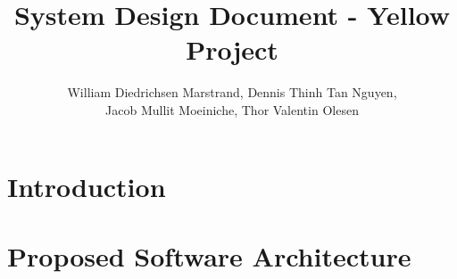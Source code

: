 \documentclass{article}
\title{System Design Document - Yellow Project}
\author{William Diedrichsen Marstrand, Dennis Thinh Tan Nguyen, 
\\Jacob Mullit Moeiniche, Thor Valentin Olesen}
\begin{document}
\maketitle

\section{Introduction}
	
	
	
\section{Proposed Software Architecture}
	
	
	
\end{document}
